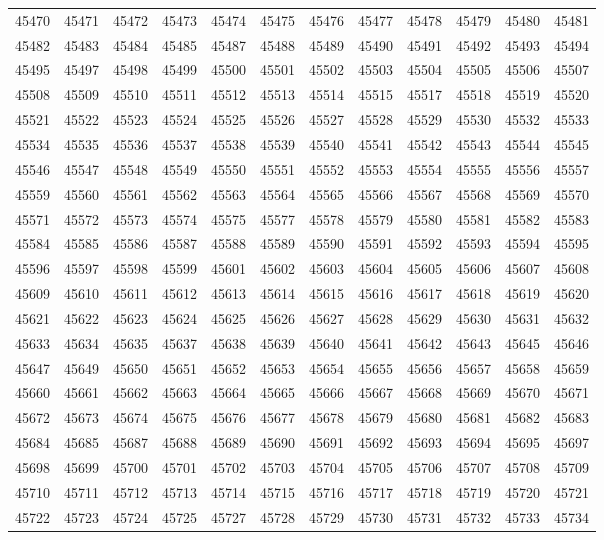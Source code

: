 \begin{center}
\begin{longtable}{llllllllllll}
45470 &45471 &45472 &45473 &45474 &45475 &45476 &45477 &45478 &45479 &45480 &45481 \\
45482 &45483 &45484 &45485 &45487 &45488 &45489 &45490 &45491 &45492 &45493 &45494 \\
45495 &45497 &45498 &45499 &45500 &45501 &45502 &45503 &45504 &45505 &45506 &45507 \\
45508 &45509 &45510 &45511 &45512 &45513 &45514 &45515 &45517 &45518 &45519 &45520 \\
45521 &45522 &45523 &45524 &45525 &45526 &45527 &45528 &45529 &45530 &45532 &45533 \\
45534 &45535 &45536 &45537 &45538 &45539 &45540 &45541 &45542 &45543 &45544 &45545 \\
45546 &45547 &45548 &45549 &45550 &45551 &45552 &45553 &45554 &45555 &45556 &45557 \\
45559 &45560 &45561 &45562 &45563 &45564 &45565 &45566 &45567 &45568 &45569 &45570 \\
45571 &45572 &45573 &45574 &45575 &45577 &45578 &45579 &45580 &45581 &45582 &45583 \\
45584 &45585 &45586 &45587 &45588 &45589 &45590 &45591 &45592 &45593 &45594 &45595 \\
45596 &45597 &45598 &45599 &45601 &45602 &45603 &45604 &45605 &45606 &45607 &45608 \\
45609 &45610 &45611 &45612 &45613 &45614 &45615 &45616 &45617 &45618 &45619 &45620 \\
45621 &45622 &45623 &45624 &45625 &45626 &45627 &45628 &45629 &45630 &45631 &45632 \\
45633 &45634 &45635 &45637 &45638 &45639 &45640 &45641 &45642 &45643 &45645 &45646 \\
45647 &45649 &45650 &45651 &45652 &45653 &45654 &45655 &45656 &45657 &45658 &45659 \\
45660 &45661 &45662 &45663 &45664 &45665 &45666 &45667 &45668 &45669 &45670 &45671 \\
45672 &45673 &45674 &45675 &45676 &45677 &45678 &45679 &45680 &45681 &45682 &45683 \\
45684 &45685 &45687 &45688 &45689 &45690 &45691 &45692 &45693 &45694 &45695 &45697 \\
45698 &45699 &45700 &45701 &45702 &45703 &45704 &45705 &45706 &45707 &45708 &45709 \\
45710 &45711 &45712 &45713 &45714 &45715 &45716 &45717 &45718 &45719 &45720 &45721 \\
45722 &45723 &45724 &45725 &45727 &45728 &45729 &45730 &45731 &45732 &45733 &45734 \\

\end{longtable}
\end{center}
